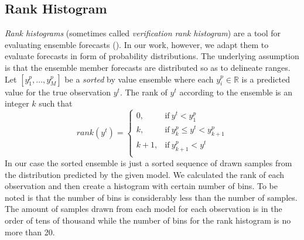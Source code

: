 \documentclass[12pt,a4paper,twoside]{scrartcl}
\numberwithin{equation}{section}
\begin{document}
\subsection{Rank Histogram}\label{sec:rank-hist}
\emph{Rank histograms} (sometimes called \emph{verification rank histogram}) are a tool for evaluating ensemble forecasts (\cite{hamill2001}). In our work, however, we adapt them to evaluate forecasts in form of probability distributions. The underlying assumption is that the ensemble member forecasts are distributed so as to delineate ranges. Let \([y_1^p,\ldots , y_M^p]\) be a \emph{sorted} by value ensemble where each \(y_i^p\in\mathbb{R}\) is a predicted value for the true observation \(y^t\). The rank of \(y^t\) according to the ensemble is an integer \(k\) such that
\begin{equation}
  rank(y^t)=
  \begin{cases}
    0,   & \text{if}\  y^t < y_1^p \\
    k,   & \text{if}\  y_{k}^p \leq y^t < y_{k+1}^p  \\
    k+1, & \text{if}\  y_{k+1}^p <  y^t  \\
  \end{cases}
\end{equation}
In our case the sorted ensemble is just a sorted sequence of drawn samples from the distribution predicted by the given model. We calculated the rank of each observation and then create a histogram with certain number of bins. To be noted is that the number of bins is considerably less than the number of samples. The amount of samples drawn from each model for each observation is in the order of tens of thousand while the number of bins for the rank histogram is no more than 20.
\end{document}
